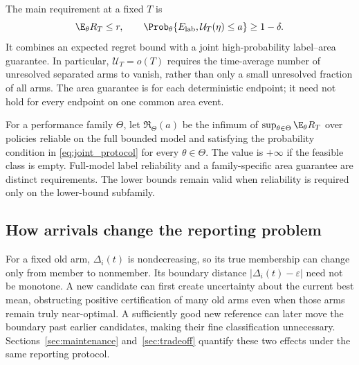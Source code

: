 \documentclass[11pt]{article}
\begin{document}
The main requirement at a fixed $T$ is
\begin{equation}
 \E_\theta R_T\le r,\qquad
 \Prob_\theta\{E_{\rm lab},\mathcal U_T(\eta)\le a\}\ge1-\delta.
 \label{eq:joint_protocol}
\end{equation}
It combines an expected regret bound with a joint high-probability
label--area guarantee. In particular, $\mathcal U_T=o(T)$ requires the
time-average number of unresolved separated arms to vanish, rather than
only a small unresolved fraction of all arms. The area guarantee is for
each deterministic endpoint; it need not hold for every endpoint on one
common area event.

For a performance family $\Theta$, let $\mathfrak R_\Theta(a)$ be the
infimum of $\sup_{\theta\in\Theta}\E_\theta R_T$ over policies reliable on
the full bounded model and satisfying the probability condition in
\eqref{eq:joint_protocol} for every $\theta\in\Theta$. The value is
$+\infty$ if the feasible class is empty. Full-model label reliability
and a family-specific area guarantee are distinct requirements. The
lower bounds remain valid when reliability is required only on the
lower-bound subfamily.

\subsection{How arrivals change the reporting problem}

For a fixed old arm, $\Delta_i(t)$ is nondecreasing, so its true membership
can change only from member to nonmember. Its boundary distance
$|\Delta_i(t)-\varepsilon|$ need not be monotone. A new candidate can first
create uncertainty about the current best mean, obstructing positive
certification of many old arms even when those arms remain truly
near-optimal. A sufficiently good new reference can later move the
boundary past earlier candidates, making their fine classification
unnecessary. Sections~\ref{sec:maintenance} and~\ref{sec:tradeoff} quantify
these two effects under the same reporting protocol.
\end{document}
